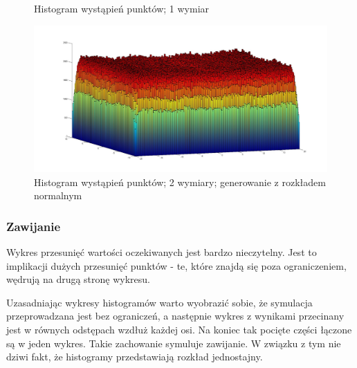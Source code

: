 \documentclass{mini}
\begin{document}
\begin{figure}[H]
\centering
{}
\quad
{}
\caption{Histogram wystąpień punktów; 1 wymiar}
\end{figure}

\begin{figure}[H]
\centering
\includegraphics[width=\textwidth]{s_n_10M_2__20_20__10_10_4_2}
\caption{Histogram wystąpień punktów; 2 wymiary; generowanie z rozkładem normalnym}
\end{figure}

\subsubsection*{Zawijanie}
Wykres przesunięć wartości oczekiwanych jest bardzo nieczytelny. Jest to implikacji dużych przesunięć punktów - te, które znajdą się poza ograniczeniem, wędrują na drugą stronę wykresu.

Uzasadniając wykresy histogramów warto wyobrazić sobie, że symulacja przeprowadzana jest bez ograniczeń, a następnie wykres z wynikami przecinany jest w równych odstępach wzdłuż każdej osi. Na koniec tak pocięte części łączone są w jeden wykres. Takie zachowanie symuluje zawijanie. W związku z tym nie dziwi fakt, że histogramy przedstawiają rozkład jednostajny.
\end{document}
